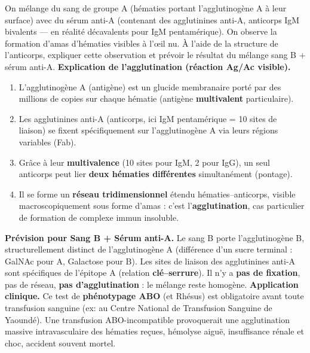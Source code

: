 \documentclass[11pt]{article}
\begin{document}
\begin{exoresolu}
On mélange du sang de groupe A (hématies portant l'agglutinogène A à leur surface) avec du sérum anti-A (contenant des agglutinines anti-A, anticorps IgM bivalents — en réalité décavalents pour IgM pentamérique). On observe la formation d'amas d'hématies visibles à l'œil nu. À l'aide de la structure de l'anticorps, expliquer cette observation et prévoir le résultat du mélange sang B + sérum anti-A.
\tcblower
\textbf{Explication de l'agglutination (réaction Ag/Ac visible).}
\begin{enumerate}
\item L'agglutinogène A (antigène) est un glucide membranaire porté par des millions de copies sur chaque hématie (antigène \textbf{multivalent} particulaire).
\item Les agglutinines anti-A (anticorps, ici IgM pentamérique = 10 sites de liaison) se fixent spécifiquement sur l'agglutinogène A via leurs régions variables (Fab).
\item Grâce à leur \textbf{multivalence} (10 sites pour IgM, 2 pour IgG), un seul anticorps peut lier \textbf{deux hématies différentes} simultanément (pontage).
\item Il se forme un \textbf{réseau tridimensionnel} étendu hématies--anticorps, visible macroscopiquement sous forme d'amas : c'est l'\textbf{agglutination}, cas particulier de formation de complexe immun insoluble.
\end{enumerate}
\textbf{Prévision pour Sang B + Sérum anti-A.} Le sang B porte l'agglutinogène B, structurellement distinct de l'agglutinogène A (différence d'un sucre terminal : GalNAc pour A, Galactose pour B). Les sites de liaison des agglutinines anti-A sont spécifiques de l'épitope A (relation \textbf{clé--serrure}). Il n'y a \textbf{pas de fixation}, pas de réseau, \textbf{pas d'agglutination} : le mélange reste homogène.
\textbf{Application clinique.} Ce test de \textbf{phénotypage ABO} (et Rhésus) est obligatoire avant toute transfusion sanguine (ex: au Centre National de Transfusion Sanguine de Yaoundé). Une transfusion ABO-incompatible provoquerait une agglutination massive intravasculaire des hématies reçues, hémolyse aiguë, insuffisance rénale et choc, accident souvent mortel.
\end{exoresolu}
\end{document}
